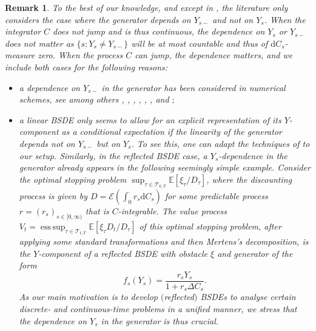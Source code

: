 \documentclass[10pt]{article} %
\newtheorem{remark}[theorem]{Remark}
\newcommand\cE{\mathcal E}
\newcommand\cT{\mathcal T}
\def \E{\mathbb{E}}
\newcommand{\1}{\mathbf{1}}
\def\d{\mathrm{d}}
\DeclareMathOperator*{\esssup}{ess\,sup}
\begin{document}
\begin{remark}\label{rem::discussion_y}
	To the best of our knowledge, and except in {\rm\cite{papapantoleon2018existence}}, the literature only considers the case where the generator depends on $Y_{s-}$ and not on $Y_s$. When the integrator $C$ does not jump and is thus continuous, the dependence on $Y_s$ or $Y_{s-}$ does not matter as $\{s :Y_s \neq Y_{s-}\}$ will be at most countable and thus of $\d C_s$-measure zero. When the process $C$ can jump, the dependence matters, and we include both cases for the following reasons:
	
	\begin{itemize}
	\item[$(i)$] a dependence on $Y_{s-}$ in the generator has been considered in numerical schemes, see among others {\rm\citeauthor*{briand2001donsker} \cite{briand2001donsker}, \citeauthor*{briand2002robustness} \cite{briand2002robustness}, \citeauthor*{briand2021donsker} \cite{briand2021donsker}, \citeauthor*{cheridito2013bs} \cite{cheridito2013bs}, \citeauthor*{madan2015convergence} \cite{madan2015convergence}}, {\rm\citeauthor*{possamai2015weak} \cite{possamai2015weak}}, and {\rm\citeauthor*{papapantoleon2021stability} \cite{papapantoleon2019stability,papapantoleon2021stability}}$;$
	
	\item[$(ii)$] a linear {\rm BSDE} only seems to allow for an explicit representation of its $Y$-component as a conditional expectation if the linearity of the generator depends not on $Y_{s-}$ but on $Y_s$. To see this, one can adapt the techniques of {\rm\cite[Lemma 2.2]{carbone2008backward}} to our setup. Similarly, in the reflected {\rm BSDE} case, a $Y_s$-dependence in the generator already appears in the following seemingly simple example. Consider the optimal stopping problem $\sup_{\tau \in \cT_{0,T}} \E[\xi_\tau/D_\tau]$, where the discounting process is given by $D = \cE(\int_0^\cdot r_s \d C_s)$ for some predictable process $r = (r_s)_{s \in [0,\infty)}$ that is $C$-integrable. The value process $V_t = \esssup_{\tau \in \cT_{t,T}} \E[\xi_\tau D_t/D_\tau]$ of this optimal stopping problem, after applying some standard transformations and then Mertens's decomposition, is the $Y$-component of a reflected {\rm BSDE} with obstacle $\xi$ and generator of the form 
		\begin{equation*}
			f_s(Y_s) = \frac{r_s Y_s}{1+r_s\Delta C_s}.
		\end{equation*}
		As our main motivation is to develop $($reflected$)$ {\rm BSDEs} to analyse certain discrete- and continuous-time problems in a unified manner, we stress that the dependence on $Y_s$ in the generator is thus crucial.
	\end{itemize}
\end{remark}
\end{document}
